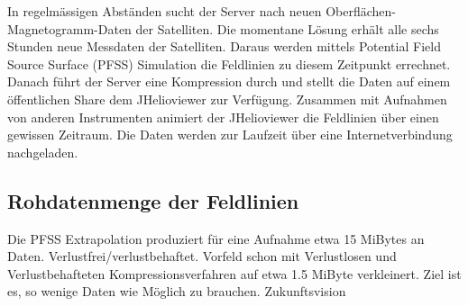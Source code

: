 In regelmässigen Abständen sucht der Server nach neuen Oberflächen-Magnetogramm-Daten der Satelliten. Die momentane Lösung erhält alle sechs Stunden neue Messdaten der Satelliten. Daraus werden mittels Potential Field Source Surface (PFSS) Simulation die Feldlinien zu diesem Zeitpunkt errechnet. Danach führt der Server eine Kompression durch und stellt die Daten auf einem öffentlichen Share dem JHelioviewer zur Verfügung. Zusammen mit Aufnahmen von anderen Instrumenten animiert der JHelioviewer die Feldlinien über einen gewissen Zeitraum. Die Daten werden zur Laufzeit über eine Internetverbindung nachgeladen.

\subsection{Rohdatenmenge der Feldlinien}
Die PFSS Extrapolation produziert für eine Aufnahme etwa 15 MiBytes an Daten.
Verlustfrei/verlustbehaftet.
Vorfeld schon mit Verlustlosen und Verlustbehafteten Kompressionsverfahren auf etwa 1.5 MiByte verkleinert.
Ziel ist es, so wenige Daten wie Möglich zu brauchen. Zukunftsvision




 